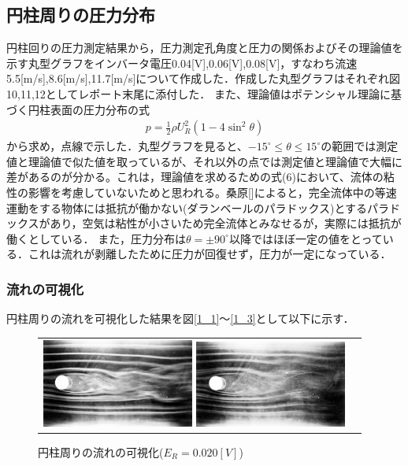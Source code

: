 \documentclass[a4paper,11pt,uplatex]{jsarticle}
\begin{document}
\subsection{円柱周りの圧力分布}
円柱回りの圧力測定結果から，圧力測定孔角度と圧力の関係およびその理論値を示す丸型グラフをインバータ電圧0.04[V],0.06[V],0.08[V]，すなわち流速5.5[m/s],8.6[m/s],11.7[m/s]について作成した．作成した丸型グラフはそれぞれ図10,11,12としてレポート末尾に添付した．
また、理論値はポテンシャル理論に基づく円柱表面の圧力分布の式
\begin{align}
  p = \frac{1}{2} \rho U_{R}^{2}(1-4 \sin^{2} \theta)
\end{align}
から求め，点線で示した．丸型グラフを見ると、$ -15^{\circ} \leq \theta \leq 15^{\circ}$の範囲では測定値と理論値で似た値を取っているが、それ以外の点では測定値と理論値で大幅に差があるのが分かる。これは，理論値を求めるための式(6)において、流体の粘性の影響を考慮していないためと思われる。桑原[\cite{s5}]によると，完全流体中の等速運動をする物体には抵抗が働かない(ダランベールのパラドックス)とするパラドックスがあり，空気は粘性が小さいため完全流体とみなせるが，実際には抵抗が働くとしている．
また，圧力分布は$\theta = \pm90^{\circ}$以降ではほぼ一定の値をとっている．これは流れが剥離したために圧力が回復せず，圧力が一定になっている．


\setcounter{figure}{12}
\subsubsection{流れの可視化}
円柱周りの流れを可視化した結果を図\ref{1_1}〜\ref{1_3}として以下に示す．
\begin{figure}[H]
  \begin{tabular}{cc}
    \begin{minipage}{0.5\hsize}
      \centering
      \includegraphics[width = 5cm]{pic/001.jpg}
      \caption{円柱周りの流れの可視化($E_R = 0.015[V]$)}
      \label{1_1}
    \end{minipage}

    \begin{minipage}{0.5\hsize}
      \centering
      \includegraphics[width = 5cm]{pic/002.jpg}
      \caption{円柱周りの流れの可視化($E_R = 0.020[V]$)}
      \label{1_2}
    \end{minipage}
  \end{tabular}
\end{figure}
\end{document}
